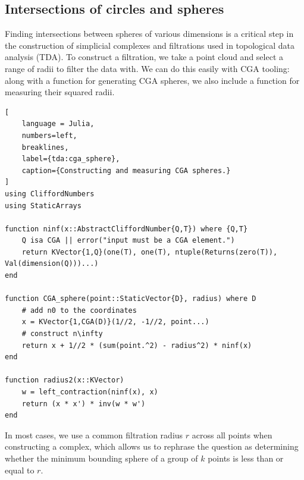 \documentclass{juliacon}
\begin{document}
\subsection{Intersections of circles and spheres}

Finding intersections between spheres of various dimensions is a critical step in the construction of simplicial complexes and filtrations used in topological data analysis (TDA).
To construct a filtration, we take a point cloud and select a range of radii to filter the data with.
We can do this easily with CGA tooling: along with a function for generating CGA spheres, we also include a function for measuring their squared radii.
\begin{lstlisting}[
    language = Julia, 
    numbers=left,
    breaklines,
    label={tda:cga_sphere}, 
    caption={Constructing and measuring CGA spheres.}
]
using CliffordNumbers
using StaticArrays

function ninf(x::AbstractCliffordNumber{Q,T}) where {Q,T}
    Q isa CGA || error("input must be a CGA element.")
    return KVector{1,Q}(one(T), one(T), ntuple(Returns(zero(T)), Val(dimension(Q)))...)
end

function CGA_sphere(point::StaticVector{D}, radius) where D
    # add n0 to the coordinates
    x = KVector{1,CGA(D)}(1//2, -1//2, point...)
    # construct n\infty
    return x + 1//2 * (sum(point.^2) - radius^2) * ninf(x)
end

function radius2(x::KVector)
    w = left_contraction(ninf(x), x)
    return (x * x') * inv(w * w')
end
\end{lstlisting}
In most cases, we use a common filtration radius $r$ across all points when constructing a complex, which allows us to rephrase the question as determining whether the minimum bounding sphere of a group of $k$ points is less than or equal to $r$.
\end{document}
